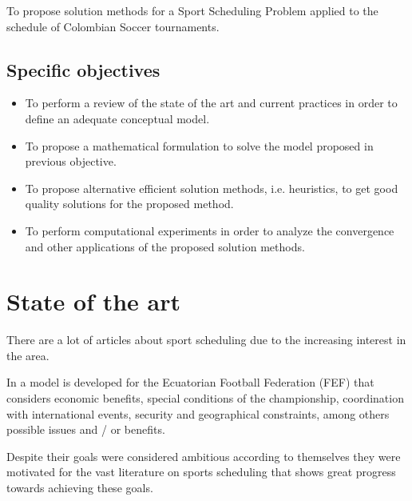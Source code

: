 \documentclass[11pt,letterpaper]{article}
\begin{document}
To propose solution methods for a Sport Scheduling Problem applied to the schedule of Colombian Soccer tournaments.


\subsection{Specific objectives}

\begin{itemize}

\item To perform a review of the state of the art and current practices in order to define an adequate conceptual model.

\item To propose a mathematical formulation to solve the model proposed in previous objective.

\item To propose alternative efficient solution methods, i.e. heuristics, to get good quality solutions for the proposed method.

\item To perform computational experiments in order to analyze the convergence and other applications of the proposed solution methods.

\end{itemize}



\section{State of the art}


There are a lot of articles about sport scheduling due to the increasing interest in the area.

In \cite{ecuadorian} a model is developed for the Ecuatorian Football Federation (FEF) that considers economic benefits, special conditions of the championship, coordination with international events, security and geographical constraints, among others possible issues and / or benefits.

Despite their goals were considered ambitious according to themselves they were motivated for the vast literature on sports scheduling that shows great progress towards achieving these goals.
\end{document}
